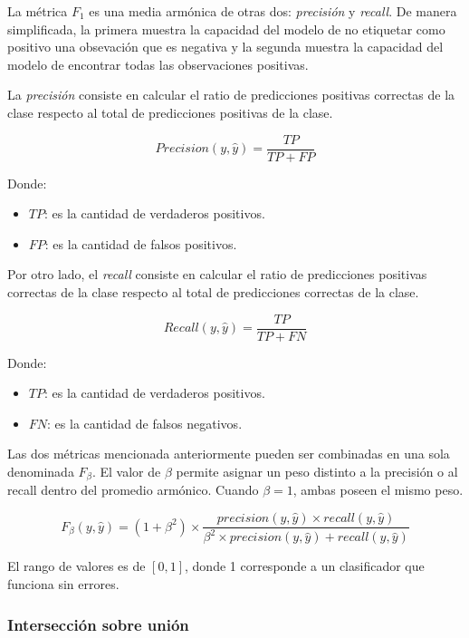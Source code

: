 La métrica $F_{1}$ es una media armónica de otras dos: {\it precisión} y {\it recall}. De manera simplificada, la
primera muestra la capacidad del modelo de no etiquetar como positivo una obsevación que es negativa y la segunda
muestra la capacidad del modelo de encontrar todas las observaciones positivas.

La {\it precisión} consiste en calcular el ratio de predicciones positivas correctas de la clase respecto al total de
predicciones positivas de la clase.

\begin{equation}
    Precision(y, \hat{y}) = \frac{TP}{TP + FP}
\end{equation}

Donde:
\begin{itemize}
    \item $TP$: es la cantidad de verdaderos positivos.
    \item $FP$: es la cantidad de falsos positivos.
\end{itemize}

Por otro lado, el {\it recall} consiste en calcular el ratio de predicciones positivas correctas de la clase respecto
al total de predicciones correctas de la clase.

\begin{equation}
    Recall(y, \hat{y}) = \frac{TP}{TP + FN}
\end{equation}

Donde:
\begin{itemize}
    \item $TP$: es la cantidad de verdaderos positivos.
    \item $FN$: es la cantidad de falsos negativos.
\end{itemize}

Las dos métricas mencionada anteriormente pueden ser combinadas en una sola denominada $F_{\beta}$. El valor de $\beta$
permite asignar un peso distinto a la precisión o al recall dentro del promedio armónico. Cuando $\beta=1$, ambas
poseen el mismo peso.

\begin{equation}
    F_{\beta}(y, \hat{y}) = (1 + \beta^2) \times \frac{precision(y, \hat{y}) \times recall(y, \hat{y})}{\beta^2 \times precision(y, \hat{y}) + recall(y, \hat{y})}
\end{equation}

El rango de valores es de $[0, 1]$, donde 1 corresponde a un clasificador que funciona sin errores.

\subsubsection{Intersección sobre unión}

